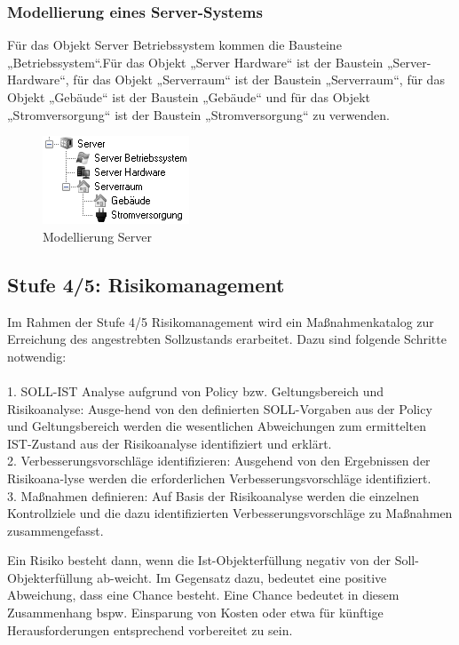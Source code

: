\subsubsection{Modellierung eines Server-Systems}
Für das Objekt Server Betriebssystem kommen die Bausteine „Betriebssystem“.Für das Objekt „Server Hardware“ ist der Baustein „Server-Hardware“, für das Objekt „Serverraum“ ist der Baustein „Serverraum“, für das Objekt „Gebäude“ ist der Baustein „Gebäude“ und für das Objekt „Stromversorgung“ ist der Baustein „Stromversorgung“ zu verwenden.
\begin{figure}[htbp]
	\centering
	\includegraphics[scale =1 ]{images/server.png}
	\caption{Modellierung Server}
	\label{fig:bsp}
\end{figure}

\subsection{Stufe 4/5: Risikomanagement}
Im Rahmen der Stufe 4/5 Risikomanagement wird ein Maßnahmenkatalog zur Erreichung des angestrebten Sollzustands erarbeitet. Dazu sind folgende Schritte notwendig:\\\\
1. SOLL-IST Analyse aufgrund von Policy bzw. Geltungsbereich und Risikoanalyse: Ausge-hend von den definierten SOLL-Vorgaben aus der Policy und Geltungsbereich werden die wesentlichen Abweichungen zum ermittelten IST-Zustand aus der Risikoanalyse identifiziert und erklärt.\\
2. Verbesserungsvorschläge identifizieren: Ausgehend von den Ergebnissen der Risikoana-lyse werden die erforderlichen Verbesserungsvorschläge identifiziert.\\
3. Maßnahmen definieren: Auf Basis der Risikoanalyse werden die einzelnen Kontrollziele und die dazu identifizierten Verbesserungsvorschläge zu Maßnahmen zusammengefasst.

Ein Risiko besteht dann, wenn die Ist-Objekterfüllung negativ von der Soll-Objekterfüllung ab-weicht. Im Gegensatz dazu, bedeutet eine positive Abweichung, dass eine Chance besteht. Eine Chance bedeutet in diesem Zusammenhang bspw. Einsparung von Kosten oder etwa für künftige Herausforderungen entsprechend vorbereitet zu sein.
